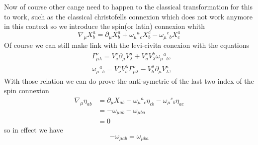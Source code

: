 \documentclass{article}
\begin{document}
Now of course other cange need to happen to the classical transformation for this to work, such as the classical christofells connexion which does not work anymore in this context
so we introduce the spin(or latin) connexion whith
\begin{equation} \label{spinconnexion}
    \nabla_\mu X^a_b = \partial_\mu X^a_b + \omega_\mu{}^a{}_c X^c_b - \omega_\mu{}^c{}_b X^a_c
\end{equation}
Of course we can still make link with the levi-civita conexion with the equations
\begin{align} \label{linkbetwinleviandlatin}
    &\Gamma_{\mu \lambda}^{\nu} = V^{\nu}_a \partial_\mu V^a_\lambda + V^\nu_aV^b_\lambda  \omega_\mu{}^a{}_b,\\
    &\omega_\mu{}^a{}_b = V^a_\nu V^\lambda_b \Gamma_{\mu \lambda}^{\nu} - V^\lambda_b \partial_\mu V^a_\lambda,
\end{align}
With those relation we can do prove the anti-symetrie of the last two index of the spin connexion
\begin{equation}
    \begin{aligned}
        \nabla_\mu \eta_{ab} &= \partial_\mu X_{ab} - \omega_\mu{}^a{}_c \eta_{cb} - \omega_\mu{}^c{}_b \eta_{ac} \\
        &=  - \omega_{\mu a b } - \omega_{\mu b a}\\
        & = 0
    \end{aligned}
\end{equation}
so in effect we have 
\begin{equation} \label{antisymlat}
    - \omega_{\mu a b }= \omega_{\mu b a}
\end{equation}
\end{document}
